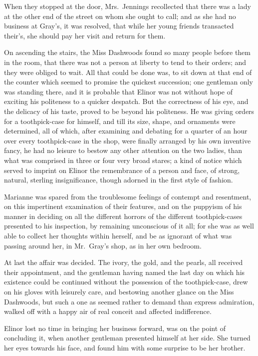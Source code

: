 \documentclass{article}
\begin{document}
When they stopped at the door, Mrs.\ Jennings recollected
that there was a lady at the other end of the street
on whom she ought to call; and as she had no business
at Gray's, it was resolved, that while her young friends
transacted their's, she should pay her visit and
return for them.

On ascending the stairs, the Miss Dashwoods found
so many people before them in the room, that there was
not a person at liberty to tend to their orders; and they
were obliged to wait.  All that could be done was, to sit
down at that end of the counter which seemed to promise the
quickest succession; one gentleman only was standing there,
and it is probable that Elinor was not without hope
of exciting his politeness to a quicker despatch.
But the correctness of his eye, and the delicacy
of his taste, proved to be beyond his politeness.
He was giving orders for a toothpick-case for himself,
and till its size, shape, and ornaments were determined,
all of which, after examining and debating for a quarter
of an hour over every toothpick-case in the shop,
were finally arranged by his own inventive fancy, he had
no leisure to bestow any other attention on the two ladies,
than what was comprised in three or four very broad stares;
a kind of notice which served to imprint on Elinor
the remembrance of a person and face, of strong,
natural, sterling insignificance, though adorned in
the first style of fashion.

Marianne was spared from the troublesome feelings
of contempt and resentment, on this impertinent examination
of their features, and on the puppyism of his manner
in deciding on all the different horrors of the different
toothpick-cases presented to his inspection, by remaining
unconscious of it all; for she was as well able to collect
her thoughts within herself, and be as ignorant of what was
passing around her, in Mr.\ Gray's shop, as in her own bedroom.

At last the affair was decided.  The ivory,
the gold, and the pearls, all received their appointment,
and the gentleman having named the last day on which his
existence could be continued without the possession of the
toothpick-case, drew on his gloves with leisurely care,
and bestowing another glance on the Miss Dashwoods, but such
a one as seemed rather to demand than express admiration,
walked off with a happy air of real conceit and affected
indifference.

Elinor lost no time in bringing her business forward,
was on the point of concluding it, when another gentleman
presented himself at her side.  She turned her eyes towards
his face, and found him with some surprise to be her brother.
\end{document}
